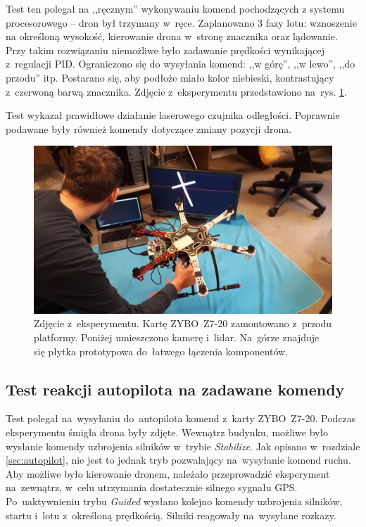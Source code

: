 Test ten polegał na ,,ręcznym'' wykonywaniu komend pochodzących z systemu procesorowego -- dron był trzymany w~ręce. 
Zaplanowano 3 fazy lotu: wznoszenie na określoną wysokość, kierowanie drona w~stronę znacznika oraz lądowanie.
Przy takim rozwiązaniu niemożliwe było zadawanie prędkości wynikającej z~regulacji PID. 
Ograniczono się do wysyłania komend: ,,w górę'', ,,w lewo'', ,,do przodu'' itp. 
Postarano się, aby podłoże miało kolor niebieski, kontrastujący z~czerwoną barwą znacznika. 
Zdjęcie z~eksperymentu przedstawiono na~rys. \ref{fig:eksperyment}.

Test wykazał prawidłowe działanie laserowego czujnika odległości. 
Poprawnie podawane były również komendy dotyczące zmiany pozycji drona. 
\begin{figure}[h]
	\centering
	\includegraphics[width=\textwidth]{eksperyment.jpg}
	\caption{Zdjęcie z~eksperymentu. Kartę ZYBO~Z7-20 zamontowano z~przodu platformy. Poniżej umieszczono kamerę i~lidar. Na~górze znajduje się płytka prototypowa do~łatwego łączenia komponentów.}
	\label{fig:eksperyment}
\end{figure}

\subsection{Test reakcji autopilota na zadawane komendy}
\label{sec:test_autopilota}
Test polegał na~wysyłaniu do~autopilota komend z~karty ZYBO~Z7-20. 
Podczas eksperymentu śmigła drona były zdjęte. 
Wewnątrz budynku, możliwe było wysłanie komendy uzbrojenia silników w~trybie \textit{Stabilize}. 
Jak opisano w~rozdziale \ref{sec:autopilot}, nie jest to jednak tryb pozwalający na~wysyłanie komend ruchu.
Aby możliwe było kierowanie dronem, należało przeprowadzić eksperyment na~zewnątrz, w~celu utrzymania dostatecznie silnego sygnału GPS. 
Po~uaktywnieniu trybu \textit{Guided} wysłano kolejno komendy uzbrojenia silników, startu i~lotu z~określoną prędkością. 
Silniki reagowały na~wysyłane rozkazy.

